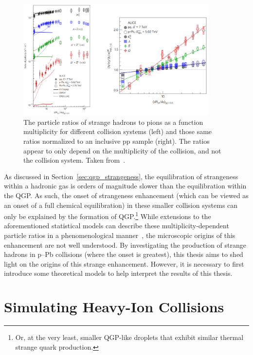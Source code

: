  \begin{figure}
    \centering
    \includegraphics[width=0.9\textwidth]{figures/introduction/strangeness_enhancement.png}
    \caption{The particle ratios of strange hadrons to pions as a function multiplicity for different collision systems (left) and those same ratios normalized to an inclusive pp sample (right). The ratios appear to only depend on the multiplicity of the collision, and not the collision system. Taken from~\cite{NATURE}.}
    \label{fig:strangeness_enhancement}
\end{figure}

As discussed in Section~\ref{sec:qgp_strangeness}, the equilibration of strangeness within a hadronic gas is orders of magnitude slower than the equilibration within the QGP. As such, the onset of strangeness enhancement (which can be viewed as an onset of a full chemical equilibration) in these smaller collision systems can only be explained by the formation of QGP.\footnote{Or, at the very least, smaller QGP-like droplets that exhibit similar thermal strange quark production.} While extensions to the aforementioned statistical models can describe these multiplicity-dependent particle ratios in a phenomenological manner~\cite{NATURE17}, the microscopic origins of this enhancement are not well understood. By investigating the production of strange hadrons in p--Pb collisions (where the onset is greatest), this thesis aims to shed light on the origins of this strange enhancement. However, it is necessary to first introduce some theoretical models to help interpret the results of this thesis.


\section{Simulating Heavy-Ion Collisions}
\label{sec:models}

